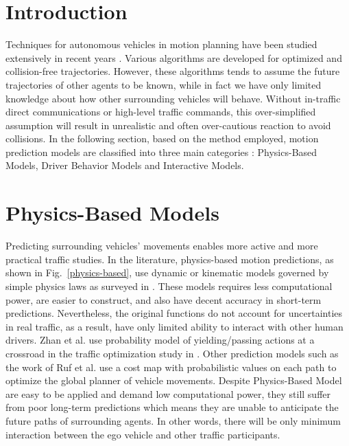 
\section{Introduction}


Techniques for autonomous vehicles in motion planning have been studied extensively in recent years \cite{motion_planning}. Various algorithms are developed for optimized and collision-free trajectories. However, these algorithms tends to assume the future trajectories of other agents to be known, while in fact we have only limited knowledge about how other surrounding vehicles will behave. Without in-traffic direct communications or high-level traffic commands, this over-simplified assumption will result in unrealistic and often over-cautious reaction to avoid collisions. In the following section, based on the method employed, motion prediction models are classified into three main categories : Physics-Based Models, Driver Behavior Models and Interactive Models.


\section{Physics-Based Models}
\label{Literature:Physics-Based}
Predicting surrounding vehicles' movements enables more active and more practical traffic studies. In the literature, physics-based motion predictions, as shown in Fig.~\ref{physics-based}, use dynamic or kinematic models governed by simple physics laws as surveyed in \cite{survey_motion_prediction}. These models requires less computational power, are easier to construct, and also have decent accuracy in short-term predictions\cite{physics_real_time, physics_velocity_obstacle}. Nevertheless, the original functions do not account for uncertainties in real traffic, as a result, have only limited ability to interact with other human drivers. Zhan et al. use  probability model of yielding/passing actions at a crossroad in the traffic optimization study in \cite{non-conservative}. Other prediction models such as the work of Ruf et al. \cite{sparc} use a cost map with probabilistic values on each path to optimize the global planner of vehicle movements. Despite Physics-Based Model are easy to be applied and demand low computational power, they still suffer from poor long-term predictions which means they are unable to anticipate the future paths of surrounding agents. In other words, there will be only minimum interaction between the ego vehicle and other traffic participants.

